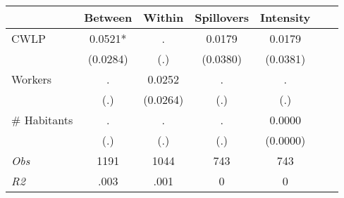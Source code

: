 \begin{tabular}{l*{6}{c}}\hline&\multicolumn{1}{c}{Between}&\multicolumn{1}{c}{Within}&\multicolumn{1}{c}{Spillovers}&\multicolumn{1}{c}{Intensity}\\ \hline 
CWLP & 0.0521* & . & 0.0179 & 0.0179 \\
 & (0.0284) & (.) & (0.0380) & (0.0381) \\
Workers & . & 0.0252 & . & . \\
 & (.) & (0.0264) & (.) & (.) \\
\# Habitants & . & . & . & 0.0000 \\
  & (.) & (.) & (.) & (0.0000) \\
\hline \textit{Obs} & 1191 & 1044 & 743 & 743  \\ \textit{R2} & .003 & .001 & 0 & 0 \\ \hline \end{tabular}
